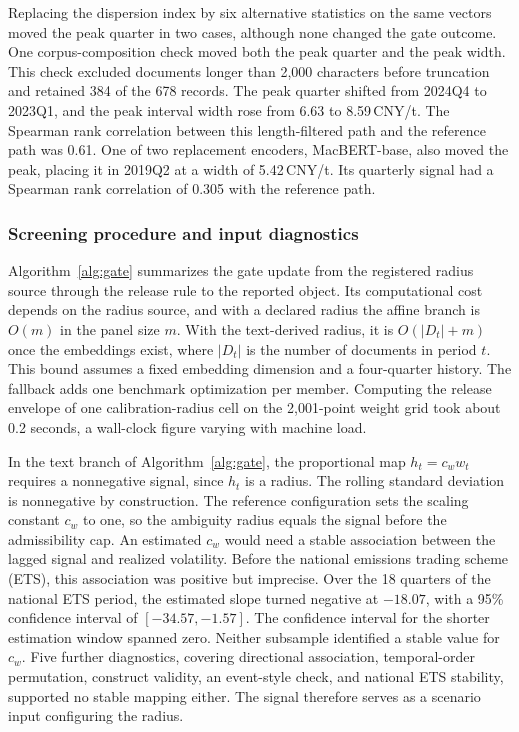 \documentclass[5p,times,authoryear]{elsarticle}
\theoremstyle{plain}
\begin{document}
Replacing the dispersion index by six alternative statistics on the same vectors moved the peak quarter in two cases, although none changed the gate outcome. One corpus-composition check moved both the peak quarter and the peak width. This check excluded documents longer than 2,000 characters before truncation and retained 384 of the 678 records. The peak quarter shifted from 2024Q4 to 2023Q1, and the peak interval width rose from 6.63 to 8.59\,CNY/t. The Spearman rank correlation between this length-filtered path and the reference path was 0.61. One of two replacement encoders, MacBERT-base, also moved the peak, placing it in 2019Q2 at a width of 5.42\,CNY/t. Its quarterly signal had a Spearman rank correlation of 0.305 with the reference path.

\subsubsection{Screening procedure and input diagnostics}

Algorithm~\ref{alg:gate} summarizes the gate update from the registered radius source through the release rule to the reported object. Its computational cost depends on the radius source, and with a declared radius the affine branch is $O(m)$ in the panel size $m$. With the text-derived radius, it is $O(\lvert D_t\rvert+m)$ once the embeddings exist, where $\lvert D_t\rvert$ is the number of documents in period $t$. This bound assumes a fixed embedding dimension and a four-quarter history. The fallback adds one benchmark optimization per member. Computing the release envelope of one calibration-radius cell on the 2,001-point weight grid took about 0.2 seconds, a wall-clock figure varying with machine load.

In the text branch of Algorithm~\ref{alg:gate}, the proportional map $h_t=c_w w_t$ requires a nonnegative signal, since $h_t$ is a radius. The rolling standard deviation is nonnegative by construction. The reference configuration sets the scaling constant $c_w$ to one, so the ambiguity radius equals the signal before the admissibility cap. An estimated $c_w$ would need a stable association between the lagged signal and realized volatility. Before the national emissions trading scheme (ETS), this association was positive but imprecise. Over the 18 quarters of the national ETS period, the estimated slope turned negative at $-18.07$, with a 95\% confidence interval of $[-34.57,-1.57]$. The confidence interval for the shorter estimation window spanned zero. Neither subsample identified a stable value for $c_w$. Five further diagnostics, covering directional association, temporal-order permutation, construct validity, an event-style check, and national ETS stability, supported no stable mapping either. The signal therefore serves as a scenario input configuring the radius.
\end{document}
